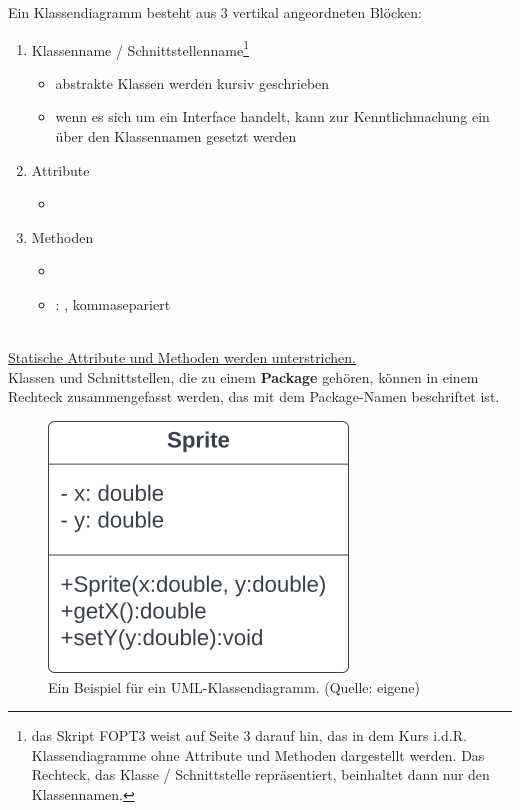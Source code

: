 \noindent
Ein Klassendiagramm besteht aus 3 vertikal angeordneten Blöcken:\\

\begin{enumerate}
    \item Klassenname / Schnittstellenname\footnote{
        das Skript FOPT3 weist auf Seite 3 darauf hin, das in dem Kurs i.d.R. Klassendiagramme ohne Attribute und Methoden dargestellt werden. Das Rechteck, das Klasse / Schnittstelle repräsentiert, beinhaltet dann nur den Klassennamen.
    }
        \begin{itemize}
            \item abstrakte Klassen werden kursiv geschrieben
            \item wenn es sich um ein Interface handelt, kann zur Kenntlichmachung ein  über den Klassennamen gesetzt werden
        \end{itemize}
    \item Attribute
        \begin{itemize}
            \item[] \code{[Sichtbarkeit] [Name]:[Typ]}
        \end{itemize}
    \item Methoden
    \begin{itemize}
        \item[] \code{[Sichtbarkeit] [Name]([Parameterliste]):[Rückgabetyp]}
        \item[] : , kommasepariert
    \end{itemize}
\end{enumerate}\\

\noindent
\ul{Statische Attribute und Methoden werden unterstrichen.}\\

\noindent
Klassen und Schnittstellen, die zu einem \textbf{Package} gehören, können in einem Rechteck zusammengefasst werden, das mit dem Package-Namen beschriftet ist.

\begin{figure}
    \centering
    \includegraphics[scale=0.5]{chapters/fopt3/img/classdiagram}
    \caption{Ein Beispiel für ein UML-Klassendiagramm. (Quelle: eigene)}
    \label{fig:classdiagram}
\end{figure}

